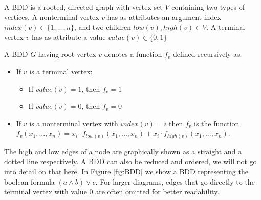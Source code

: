 \begin{mydef}
A BDD is a rooted, directed graph with vertex set $V$ containing two types of vertices. A nonterminal vertex $v$ has as attributes an argument index $index(v) \in \{1,...,n\}$, and two children $low(v),high(v) \in V$. A terminal vertex $v$ has as attribute a value $value(v) \in \{0,1\}$
\end{mydef}



\begin{mydef}
A BDD $G$ having root vertex $v$ denotes a function $f_v$ defined recursively as:
\begin{itemize}
\item If $v$ is a terminal vertex:
\begin{itemize}
\item If $value(v)=1$, then $f_v=1$
\item If $value(v)=0$, then $f_v=0$
\end{itemize}
\item If $v$ is a nonterminal vertex with $index(v)=i$ then $f_v$ is the function
$f_v(x_1,...,x_n) = \overline{x_i}\cdot f_{low(v)}(x_1,...,x_n)+x_i\cdot f_{high(v)}(x_1,...,x_n)$.
\end{itemize}
\end{mydef}

The high and low edges of a node are graphically shown as a straight and a dotted line respectively. A BDD can also be reduced and ordered, we will not go into detail on that here. In Figure \ref{fig:BDD} we show a BDD representing the boolean formula $(a \wedge b) \vee c$. For larger diagrams, edges that go directly to the terminal vertex with value $0$ are often omitted for better readability. 